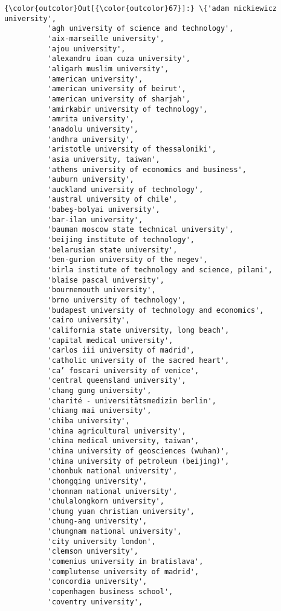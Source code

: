 \documentclass[11pt]{article}
\begin{document}
\begin{Verbatim}[commandchars=\\\{\}]
{\color{outcolor}Out[{\color{outcolor}67}]:} \{'adam mickiewicz university',
          'agh university of science and technology',
          'aix-marseille university',
          'ajou university',
          'alexandru ioan cuza university',
          'aligarh muslim university',
          'american university',
          'american university of beirut',
          'american university of sharjah',
          'amirkabir university of technology',
          'amrita university',
          'anadolu university',
          'andhra university',
          'aristotle university of thessaloniki',
          'asia university, taiwan',
          'athens university of economics and business',
          'auburn university',
          'auckland university of technology',
          'austral university of chile',
          'babeş-bolyai university',
          'bar-ilan university',
          'bauman moscow state technical university',
          'beijing institute of technology',
          'belarusian state university',
          'ben-gurion university of the negev',
          'birla institute of technology and science, pilani',
          'blaise pascal university',
          'bournemouth university',
          'brno university of technology',
          'budapest university of technology and economics',
          'cairo university',
          'california state university, long beach',
          'capital medical university',
          'carlos iii university of madrid',
          'catholic university of the sacred heart',
          'ca’ foscari university of venice',
          'central queensland university',
          'chang gung university',
          'charité - universitätsmedizin berlin',
          'chiang mai university',
          'chiba university',
          'china agricultural university',
          'china medical university, taiwan',
          'china university of geosciences (wuhan)',
          'china university of petroleum (beijing)',
          'chonbuk national university',
          'chongqing university',
          'chonnam national university',
          'chulalongkorn university',
          'chung yuan christian university',
          'chung-ang university',
          'chungnam national university',
          'city university london',
          'clemson university',
          'comenius university in bratislava',
          'complutense university of madrid',
          'concordia university',
          'copenhagen business school',
          'coventry university',

\end{Verbatim}
\end{document}
